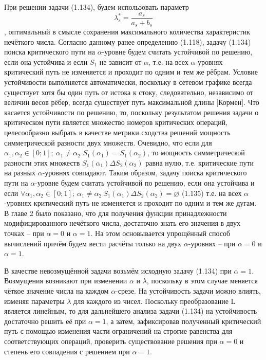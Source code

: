 При решении задачи (1.134), будем использовать параметр \[\lambda _{s}^{*}=\frac{{{a}_{s}}}{{{a}_{s}}+{{b}_{s}}}\], оптимальный в смысле сохранения максимального количества характеристик нечёткого числа.
Согласно данному ранее определению (1.118), задачу (1.134) поиска критического пути на $\alpha$-уровне будем считать устойчивой по решению, если она устойчива и если ${{S}_{1}}$ не зависит от $\alpha$, т.е. на всех $\alpha$-уровнях критический путь не изменяется и проходит по одним и тем же рёбрам. Условие устойчивости выполняется автоматически, поскольку в сетевом графике всегда существует хотя бы один путь от истока к стоку, следовательно, независимо от величин весов рёбер, всегда существует путь максимальной длины [Кормен]. Что касается устойчивости по решению, то, поскольку результатом решения задачи о критическом пути является множество номеров критических операций, целесообразно выбрать в качестве метрики сходства решений мощность симметрической разности двух множеств. Очевидно, что если для ${{\alpha }_{1}},{{\alpha }_{2}}\in \left[ 0;1 \right];\ {{\alpha }_{1}}\ne {{\alpha }_{2}}$ ${{S}_{1}}\left( {{\alpha }_{1}} \right)={{S}_{1}}\left( {{\alpha }_{2}} \right)$, то мощность симметрической разности этих множеств ${{S}_{1}}\left( {{\alpha }_{1}} \right)\Delta {{S}_{2}}\left( {{\alpha }_{2}} \right)$ равна нулю, т.е. критические пути на разных $\alpha$-уровнях совпадают.
Таким образом, задачу поиска критического пути на $\alpha $-уровне будем считать устойчивой по решению, если она устойчива и если 
	$\forall {{\alpha }_{1}},{{\alpha }_{2}}\in \left[ 0;1 \right];\ {{\alpha }_{1}}\ne {{\alpha }_{2}}\ {{S}_{1}}\left( {{\alpha }_{1}} \right)\Delta {{S}_{2}}\left( {{\alpha }_{2}} \right)=\varnothing $ 	(1.135)
т.е. на всех $\alpha $-уровнях критический путь не изменяется и проходит по одним и тем же дугам. 
В главе 2 было показано, что для получения функции принадлежности модифицированного нечёткого числа, достаточно знать его значения в двух точках – при $\alpha=0$ и $\alpha=1$. На этом основывается упрощённый способ вычислений 
причём будем вести расчёты только на двух $\alpha$-уровнях – при $\alpha=0$ и $\alpha=1$.

В качестве невозмущённой задачи возьмём исходную задачу (1.134) при $\alpha =1$. Возмущения возникают при изменении $\alpha$ и $\lambda$, поскольку в этом случае меняется чёткое значение числа на каждом $\alpha$-срезе. На устойчивость задачи можно влиять, изменяя параметры $\lambda$ для каждого из чисел. Поскольку преобразование L является линейным, то для дальнейшего анализа задачи (1.134) на устойчивость достаточно решить её при $\alpha =1$, а затем, зафиксировав полученный критический путь с помощью изменения части ограничений на строгие равенства для соответствующих операций, проверить существование решения при $\alpha =0$ и степень его совпадения с решением при $\alpha =1$.
